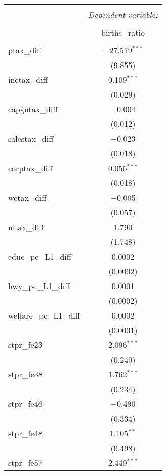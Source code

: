 
\begin{table}[!htbp] \centering 
  \caption{} 
  \label{} 
\begin{tabular}{@{\extracolsep{5pt}}lc} 
\\[-1.8ex]\hline 
\hline \\[-1.8ex] 
 & \multicolumn{1}{c}{\textit{Dependent variable:}} \\ 
\cline{2-2} 
\\[-1.8ex] & births\_ratio \\ 
\hline \\[-1.8ex] 
 ptax\_diff & $-$27.519$^{***}$ \\ 
  & (9.855) \\ 
  inctax\_diff & 0.109$^{***}$ \\ 
  & (0.029) \\ 
  capgntax\_diff & $-$0.004 \\ 
  & (0.012) \\ 
  salestax\_diff & $-$0.023 \\ 
  & (0.018) \\ 
  corptax\_diff & 0.056$^{***}$ \\ 
  & (0.018) \\ 
  wctax\_diff & $-$0.005 \\ 
  & (0.057) \\ 
  uitax\_diff & 1.790 \\ 
  & (1.748) \\ 
  educ\_pc\_L1\_diff & 0.0002 \\ 
  & (0.0002) \\ 
  hwy\_pc\_L1\_diff & 0.0001 \\ 
  & (0.0002) \\ 
  welfare\_pc\_L1\_diff & 0.0002 \\ 
  & (0.0001) \\ 
  stpr\_fe23 & 2.096$^{***}$ \\ 
  & (0.240) \\ 
  stpr\_fe38 & 1.762$^{***}$ \\ 
  & (0.234) \\ 
  stpr\_fe46 & $-$0.490 \\ 
  & (0.334) \\ 
  stpr\_fe48 & 1.105$^{**}$ \\ 
  & (0.498) \\ 
  stpr\_fe57 & 2.449$^{***}$ \\ 

\end{tabular}
\end{table}

